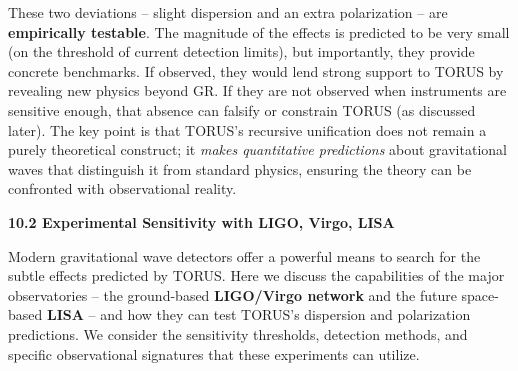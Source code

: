 These two deviations -- slight dispersion and an extra polarization --
are \textbf{empirically testable}. The magnitude of the effects is
predicted to be very small (on the threshold of current detection
limits), but importantly, they provide concrete benchmarks. If observed,
they would lend strong support to TORUS by revealing new physics beyond
GR. If they are not observed when instruments are sensitive enough, that
absence can falsify or constrain TORUS (as discussed later). The key
point is that TORUS's recursive unification does not remain a purely
theoretical construct; it \emph{makes quantitative predictions} about
gravitational waves that distinguish it from standard physics, ensuring
the theory can be confronted with observational reality​.

\textbf{10.2 Experimental Sensitivity with LIGO, Virgo, LISA}

Modern gravitational wave detectors offer a powerful means to search for
the subtle effects predicted by TORUS. Here we discuss the capabilities
of the major observatories -- the ground-based \textbf{LIGO/Virgo
network} and the future space-based \textbf{LISA} -- and how they can
test TORUS's dispersion and polarization predictions. We consider the
sensitivity thresholds, detection methods, and specific observational
signatures that these experiments can utilize.


